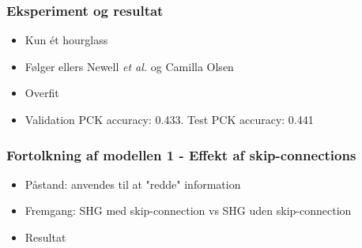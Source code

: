 \documentclass{beamer}
\begin{document}
\begin{frame}
    \frametitle{Eksperiment og resultat}
    \begin{minipage}{\textwidth}
        \begin{itemize}
            \item<1-> Kun ét hourglass
            \item<2-> Følger ellers Newell \textit{et al.} og Camilla Olsen
            \item<3-> Overfit
            \item<4-> Validation PCK accuracy: 0.433. Test PCK accuracy: 0.441
        \end{itemize}
    \end{minipage}
    \begin{minipage}{\textwidth}
    \end{minipage}
\end{frame}

\begin{frame}
    \frametitle{Fortolkning af modellen 1 - Effekt af skip-connections}
    \begin{itemize}
        \item<1-> Påstand: anvendes til at "redde" information
        \item<2-> Fremgang: SHG med skip-connection vs SHG uden skip-connection
        \item<3-> Resultat
    \end{itemize}
    \begin{minipage}{\textwidth}
    \end{minipage}
\end{frame}
\end{document}
